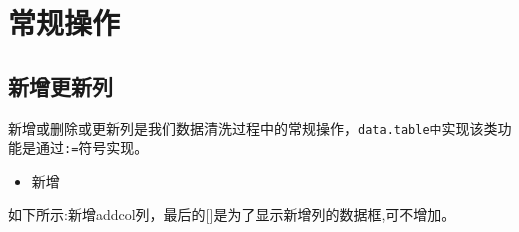 \documentclass[
]{book}
\providecommand{\tightlist}{%
  \setlength{\itemsep}{0pt}\setlength{\parskip}{0pt}}
\begin{document}
\hypertarget{ux5e38ux89c4ux64cdux4f5c}{%
\section{常规操作}\label{ux5e38ux89c4ux64cdux4f5c}}

\hypertarget{ux65b0ux589eux66f4ux65b0ux5217}{%
\subsection{新增更新列}\label{ux65b0ux589eux66f4ux65b0ux5217}}

新增或删除或更新列是我们数据清洗过程中的常规操作，\texttt{data.table中}实现该类功能是通过\texttt{:=}符号实现。

\begin{itemize}
\tightlist
\item
  新增
\end{itemize}

如下所示:新增addcol列，最后的{[}{]}是为了显示新增列的数据框,可不增加。
\end{document}
